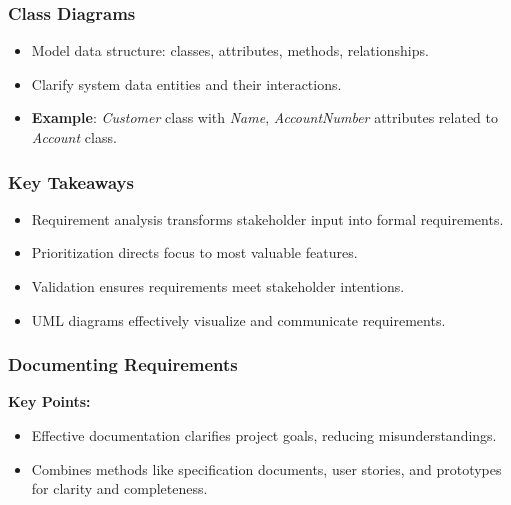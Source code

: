 \documentclass{beamer}
\begin{document}
\begin{frame}[fragile]
    \frametitle{Class Diagrams}
    \begin{itemize}
        \item Model data structure: classes, attributes, methods, relationships.
        \item Clarify system data entities and their interactions.
        \item \textbf{Example}: \textit{Customer} class with \textit{Name}, \textit{AccountNumber} attributes related to \textit{Account} class.
    \end{itemize}
\end{frame}

\begin{frame}[fragile]
    \frametitle{Key Takeaways}
    \begin{itemize}
        \item Requirement analysis transforms stakeholder input into formal requirements.
        \item Prioritization directs focus to most valuable features.
        \item Validation ensures requirements meet stakeholder intentions.
        \item UML diagrams effectively visualize and communicate requirements.
    \end{itemize}
\end{frame}

\begin{frame}[fragile]
    \frametitle{Documenting Requirements}
    \textbf{Key Points:}
    \begin{itemize}
        \item Effective documentation clarifies project goals, reducing misunderstandings.
        \item Combines methods like specification documents, user stories, and prototypes for clarity and completeness.
    \end{itemize}
\end{frame}
\end{document}

